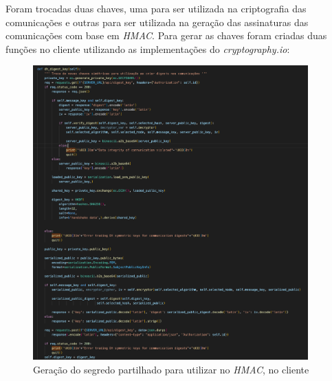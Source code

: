 \documentclass[10pt,english]{article}
\begin{document}
\par Foram trocadas duas chaves, uma para ser utilizada na criptografia das comunicações e outras para ser utilizada na geração das assinaturas das comunicações com base em \textit{HMAC}. Para gerar as chaves foram criadas duas funções no cliente utilizando as implementações do \textit{cryptography.io}:

\begin{figure}[!h]
        \centering
        \includegraphics[width=400]{images/dh_digest_client.png}
        \caption{Geração do segredo partilhado para utilizar no \textit{HMAC}, no cliente}
\end{figure}
\end{document}
